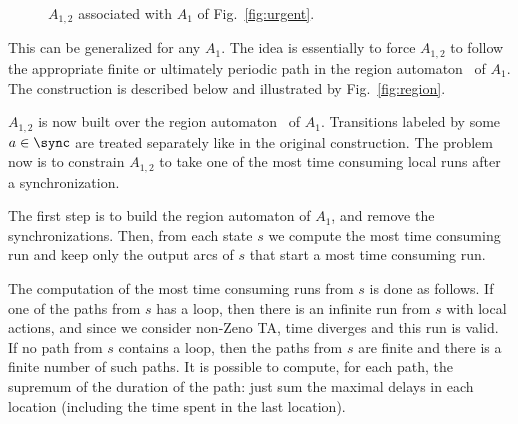 \documentclass{LMCS}
\theoremstyle{plain}\newtheorem*{prop11}{Proposition~\ref{prop:states} bis}
\begin{document}
\begin{figure}[t]
  \centering
  \def\b{3.7}
\def\c{1.6cm}
  \caption[$A_{1,2}$ associated with $A_1$ of Fig.~\ref{fig:urgent}]
  {$A_{1,2}$ associated with $A_1$ of Fig.~\ref{fig:urgent}.}\label{fig:result}
\end{figure}


This can be generalized for any $A_1$. The idea is essentially to force
$A_{1,2}$ to follow the appropriate finite or ultimately periodic path in the
region automaton~\cite{AD94} of $A_1$.
The construction is described below and illustrated by
Fig.~\ref{fig:region}.

$A_{1,2}$ is now built over the region automaton~\cite{AD94}
of $A_1$. Transitions labeled by some $a\in\sync$ are treated separately
like in the original construction. The problem now is to constrain $A_{1,2}$
to take one of the most time consuming local runs after a synchronization.

The first step is to build the region automaton of $A_1$, and remove the
synchronizations. Then, from each state $s$ we compute the most time consuming
run and keep only the output arcs of $s$ that start a most time consuming run.

The computation of the most time consuming runs from $s$ is done as follows.
If one of the paths from $s$ has a loop, then there is an infinite run from
$s$ with local actions, and since we consider non-Zeno TA, time diverges and
this run is valid.
If no path from $s$ contains a loop, then
the paths from $s$ are finite and there is a finite number of such paths.
It is possible to compute, for each path, the supremum of the duration of the path:
just sum the maximal delays in each location (including the time spent in the
last location).
\end{document}
